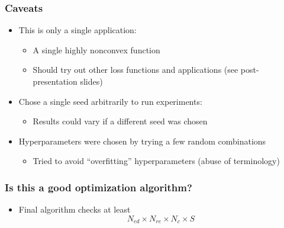 \documentclass{beamer}
\begin{document}
\begin{frame}
\frametitle{Caveats}
\begin{itemize}
  \item<1-> This is only a single application:
  \begin{itemize}
    \item<1-> A single highly nonconvex function
    \item<1-> Should try out other loss functions and applications (see post-presentation slides)
  \end{itemize}
  \item<2-> Chose a single seed arbitrarily to run experiments:
  \begin{itemize}
    \item<2-> Results could vary if a different seed was chosen
  \end{itemize}
  \item<3-> Hyperparameters were chosen by trying a few random combinations
  \begin{itemize}
    \item<3-> Tried to avoid ``overfitting'' hyperparameters (abuse of terminology)
  \end{itemize}
\end{itemize}
\end{frame}

\begin{frame}
\frametitle{Is this a good optimization algorithm?}
\begin{itemize}
  \item Final algorithm checks at least
  $$
  N_{ed} \times N_{re} \times N_c \times S
  $$
\end{itemize}

\end{frame}

%
\end{document}

